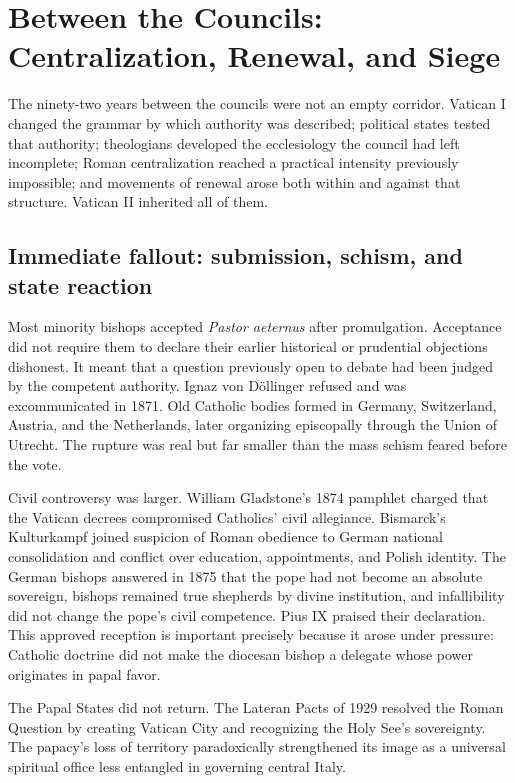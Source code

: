 \section{Between the Councils: Centralization, Renewal, and Siege}

The ninety-two years between the councils were not an empty corridor. Vatican I changed the grammar by which authority was described; political states tested that authority; theologians developed the ecclesiology the council had left incomplete; Roman centralization reached a practical intensity previously impossible; and movements of renewal arose both within and against that structure. Vatican II inherited all of them.

\subsection{Immediate fallout: submission, schism, and state reaction}

Most minority bishops accepted \emph{Pastor aeternus} after promulgation. Acceptance did not require them to declare their earlier historical or prudential objections dishonest. It meant that a question previously open to debate had been judged by the competent authority. Ignaz von Döllinger refused and was excommunicated in 1871. Old Catholic bodies formed in Germany, Switzerland, Austria, and the Netherlands, later organizing episcopally through the Union of Utrecht. The rupture was real but far smaller than the mass schism feared before the vote.

Civil controversy was larger. William Gladstone's 1874 pamphlet charged that the Vatican decrees compromised Catholics' civil allegiance. Bismarck's Kulturkampf joined suspicion of Roman obedience to German national consolidation and conflict over education, appointments, and Polish identity. The German bishops answered in 1875 that the pope had not become an absolute sovereign, bishops remained true shepherds by divine institution, and infallibility did not change the pope's civil competence. Pius IX praised their declaration. This approved reception is important precisely because it arose under pressure: Catholic doctrine did not make the diocesan bishop a delegate whose power originates in papal favor.

The Papal States did not return. The Lateran Pacts of 1929 resolved the Roman Question by creating Vatican City and recognizing the Holy See's sovereignty. The papacy's loss of territory paradoxically strengthened its image as a universal spiritual office less entangled in governing central Italy.

